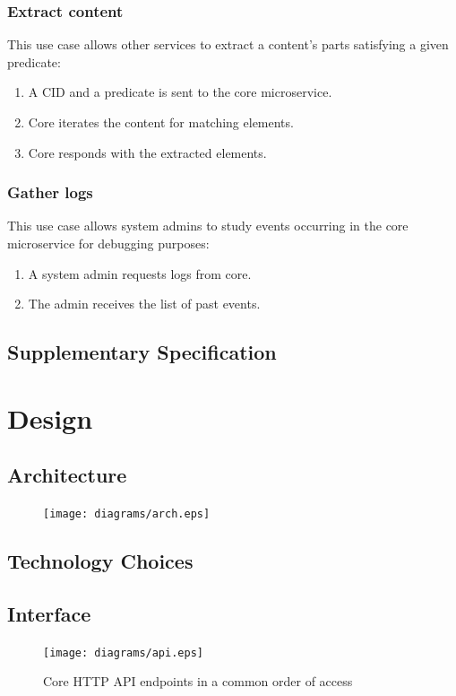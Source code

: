 \documentclass[a4paper,oneside,12pt]{book}
\begin{document}
\subsubsection{Extract content}
This use case allows other services to extract a content's parts
satisfying a given \gls{predicate}:
\begin{enumerate}
  \item A CID and a \gls{predicate} is sent to the core microservice.
  \item Core iterates the content for matching elements.
  \item Core responds with the extracted elements.
\end{enumerate}

\subsubsection{Gather logs}
This use case allows system admins to study events occurring
in the core microservice for debugging purposes:
\begin{enumerate}
  \item A system admin requests logs from core.
  \item The admin receives the list of past events.
\end{enumerate}

\subsection{Supplementary Specification}

\section{Design}
\subsection{Architecture}
\begin{figure}
  \texttt{[image: diagrams/arch.eps]}
\end{figure}

\subsection{Technology Choices}

\subsection{Interface}
\begin{figure}
  \texttt{[image: diagrams/api.eps]}
  \caption{Core HTTP API endpoints in a common order of access}
  \label{db}
\end{figure}
\end{document}
